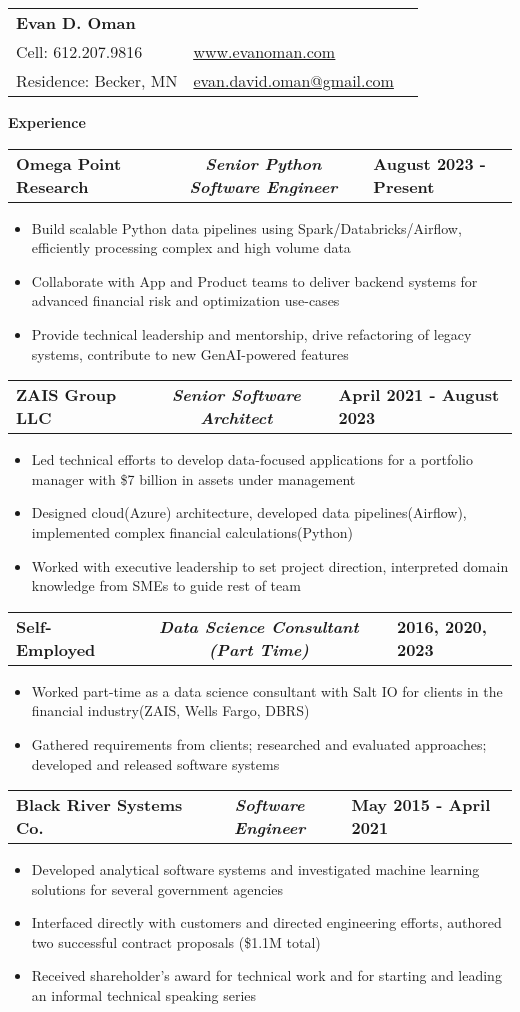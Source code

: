 \documentclass[letterpaper,10pt]{article}
\newcommand{\myitem}{\item[$\triangleright$]}
\newcommand{\resHeading}[1]{{
		\begin{tcolorbox}[size=title, sharp corners, colback=mygrey, colframe=mygrey]
			\centering\textbf{\large #1}
		\end{tcolorbox}
	}}
\newcommand{\threeColSubHeading}[3]{
		\begin{tabularx}{\textwidth}{XcX}
				\textbf{#1} & \textit{\textbf{#2}}  & \hfill\textbf{#3}
		\end{tabularx}
	}
\begin{document}
	\begin{tabularx}{\textwidth}{lXr}
		\textbf{\Large Evan D. Oman}  &   \\
		Cell: 612.207.9816 & \hfill\underline{\href{http://www.evanoman.com}{www.evanoman.com}}\\
		Residence: Becker, MN& \hfill\href{mailto:evan.david.oman@gmail.com}{evan.david.oman@gmail.com}\\
	\end{tabularx}
	\resHeading{Experience}
		\threeColSubHeading{Omega Point Research}{Senior Python Software Engineer}{August 2023 - Present}
		\begin{itemize}
			\myitem Build scalable Python data pipelines using Spark/Databricks/Airflow, efficiently processing complex and high volume data
			\myitem Collaborate with App and Product teams to deliver backend systems for advanced financial risk and optimization use-cases
			\myitem Provide technical leadership and mentorship, drive refactoring of legacy systems, contribute to new GenAI-powered features
		\end{itemize}
		\threeColSubHeading{ZAIS Group LLC}{Senior Software Architect}{April 2021 - August 2023}
		\begin{itemize}
			\myitem Led technical efforts to develop data-focused applications for a portfolio manager with \$7 billion in assets under management
			\myitem Designed cloud(Azure) architecture, developed data pipelines(Airflow), implemented complex financial calculations(Python)
			\myitem Worked with executive leadership to set project direction, interpreted domain knowledge from SMEs to guide rest of team
		\end{itemize}
		\threeColSubHeading{Self-Employed}{Data Science Consultant (Part Time)}{2016, 2020, 2023}
			\begin{itemize}
				\myitem Worked part-time as a data science consultant with Salt IO for clients in the financial industry(ZAIS, Wells Fargo, DBRS)
				\myitem Gathered requirements from clients; researched and evaluated approaches; developed and released software systems
			\end{itemize}
		\threeColSubHeading{Black River Systems Co.}{Software Engineer}{May 2015 - April 2021}
			\begin{itemize}
				\myitem Developed analytical software systems and investigated machine learning solutions for several government agencies
				\myitem Interfaced directly with customers and directed engineering efforts, authored two successful contract proposals (\$1.1M total)
				\myitem Received shareholder's award for technical work and for starting and leading an informal technical speaking series
			\end{itemize}
\end{document}
